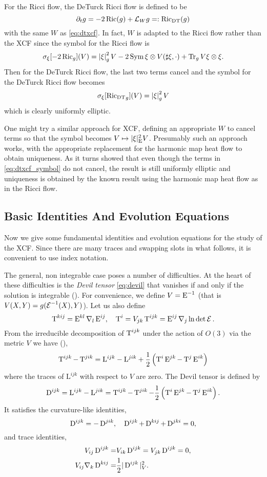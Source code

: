\documentclass[a4paper,12pt]{amsart}
\begin{document}
\begin{rem}
For the Ricci flow, the DeTurck Ricci flow is defined to be
\[
\partial_t g = -2\operatorname{Ric} (g) + \mathcal{L}_{W} g =: \operatorname{\operatorname{Ric}_{\operatorname{DT}}} (g)
\]
with the same \(W\) as \eqref{eq:dtxcf}. In fact, \(W\) is adapted to the Ricci flow rather than the XCF since the symbol for the Ricci flow is
\[
\sigma_{\xi} [-2\operatorname{Ric}_g] (V) = \left\lvert{\xi}\right\rvert^2_{g}V - 2 \operatorname{Sym} \xi \otimes V(\sharp \xi, \cdot) + \operatorname{Tr}_g V \xi \otimes \xi.
\]
Then for the DeTurck Ricci flow, the last two terms cancel and the symbol for the DeTurck Ricci flow becomes
\[
\sigma_{\xi} [\operatorname{\operatorname{Ric}_{\operatorname{DT}}}_g] (V) = \left\lvert{\xi}\right\rvert_g^2 V
\]
which is clearly uniformly elliptic.

One might try a similar approach for XCF, defining an appropriate \(W\) to cancel terms so that the symbol becomes \(V \mapsto |\xi|_{\operatorname{E}}^2 V\). Presumably such an approach works, with the appropriate replacement for the harmonic map heat flow to obtain uniqueness. As it turns \cite{MR2207496} showed that even though the terms in \eqref{eq:dtxcf_symbol} do not cancel, the result is still uniformly elliptic and uniqueness is obtained by the known result using the harmonic map heat flow as in the Ricci flow.
\end{rem}

\subsection{Basic Identities And Evolution Equations}
\label{subsec:xcf_identities}

Now we give some fundamental identities and evolution equations for the study of the XCF. Since there are many traces and swapping slots in what follows, it is convenient to use index notation.

The general, non integrable case poses a number of difficulties. At the heart of these difficulties is the \emph{Devil tensor} \eqref{eq:devil} that vanishes if and only if the solution is integrable (). For convenience, we define \(V = \operatorname{E}^{-1}\) (that is \(V(X, Y) = g(\operatorname{\mathcal{E}}^{-1} (X), Y)\)). Let us also define
\begin{equation}
\label{eq:T}
\operatorname{T}^{kij} = \operatorname{E}^{kl}\nabla_l \operatorname{E}^{ij}, \quad \operatorname{T}^i = V_{jk}\operatorname{T}^{ijk} = \operatorname{E}^{ij}\nabla_j \ln\det\operatorname{\mathcal{E}}.
\end{equation}
From the irreducible decomposition of $\operatorname{T}^{ijk}$ under the action of \(O(3)\) via the metric \(V\) we have (\cite[p. 6]{MR2055396}),
\[
\operatorname{T}^{ijk}-\operatorname{T}^{jik} = \mathrm{L}^{ijk}-\mathrm{L}^{jik} + \frac{1}{2}\left(\operatorname{T}^i\operatorname{E}^{jk}-\operatorname{T}^j\operatorname{E}^{ik}\right)
\]
where the traces of $\mathrm{L}^{ijk}$ with respect to $V$ are zero. The Devil tensor is defined by
\begin{equation}
\label{eq:devil}
\operatorname{D}^{ijk}=\mathrm{L}^{ijk}-\mathrm{L}^{jik} = \operatorname{T}^{ijk}-\operatorname{T}^{jik} - \frac{1}{2}\left(\operatorname{T}^i\operatorname{E}^{jk}-\operatorname{T}^j\operatorname{E}^{ik}\right).
\end{equation}
It satisfies the curvature-like identities,
\[
\operatorname{D}^{ijk} = -\operatorname{D}^{jik},\quad \operatorname{D}^{ijk}+\operatorname{D}^{kij}+\operatorname{D}^{jki} = 0,
\]
and trace identities,
\begin{align*}
V_{ij}\operatorname{D}^{ijk}=&V_{ik}\operatorname{D}^{ijk}=V_{jk}\operatorname{D}^{ijk}=0,\\
V_{ij}\nabla_k\operatorname{D}^{kij}=&\frac{1}{2}|\operatorname{D}^{ijk}|_V^2.
\end{align*}
\end{document}

